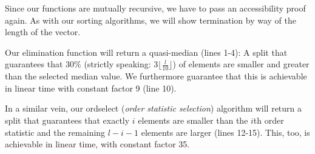 Since our functions are mutually recursive, we have to pass an accessibility proof again. As with our sorting algorithms, we will show termination by way of the length of the vector.

Our elimination function will return a quasi-median (lines 1-4): A split that guarantees that 30\% (strictly speaking: $3\lfloor \frac l {10}\rfloor$) of elements are smaller and greater than the selected median value. We furthermore guarantee that this is achievable in linear time with constant factor 9 (line 10).

In a similar vein, our ordselect (\emph{order statistic selection}) algorithm will return a split that guarantees that exactly $i$ elements are smaller than the $i$th order statistic and the remaining $l - i - 1$ elements are larger (lines 12-15). This, too, is achievable in linear time, with constant factor 35.

